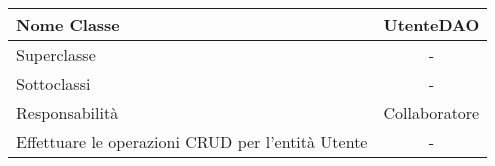 
\setcounter{table}{0}
\begin{table}[H]
    \centering
    \begin{tabular}{||   l  ||  c   ||}
        \hline
        \rowcolor{Gray}
        Nome Classe & UtenteDAO\\
        \hline
        Superclasse  &  - \\
        \hline
        Sottoclassi & - \\
        \hline
        \hline
         Responsabilità & Collaboratore \\
         \hline
          Effettuare le operazioni CRUD per l'entità Utente & - \\
         \hline
    \end{tabular}
\end{table}

    
       
